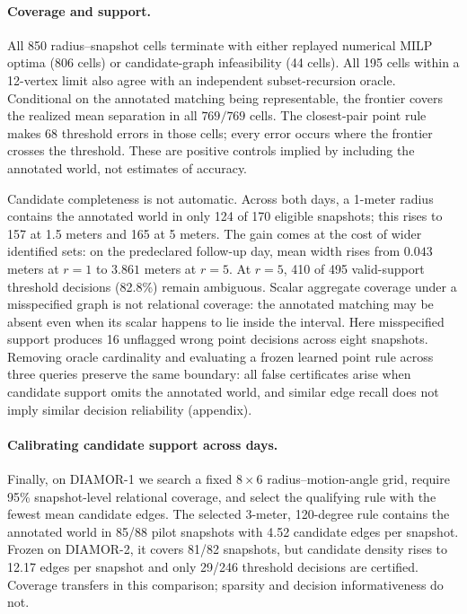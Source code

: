 \paragraph{Coverage and support.}
All 850 radius--snapshot cells terminate with either replayed numerical MILP
optima (806 cells) or candidate-graph infeasibility (44 cells).  All 195 cells
within a 12-vertex limit also agree with an independent subset-recursion oracle.
Conditional on the annotated matching being representable, the frontier covers
the realized mean separation in all $769/769$ cells.  The closest-pair point
rule makes 68 threshold errors in those cells; every error occurs where the
frontier crosses the threshold. These are positive controls implied by
including the annotated world, not estimates of accuracy.

Candidate completeness is not automatic.  Across both days, a 1-meter radius
contains the annotated world in only 124 of 170 eligible snapshots; this rises
to 157 at 1.5 meters and 165 at 5 meters.  The gain comes at the cost of wider
identified sets: on the predeclared follow-up day, mean width rises from
$0.043$ meters at $r=1$ to $3.861$ meters at $r=5$.  At $r=5$, 410 of 495
valid-support threshold decisions (82.8\%) remain ambiguous.  Scalar aggregate
coverage under a misspecified graph is not relational coverage: the annotated
matching may be absent even when its scalar happens to lie inside the interval.
Here misspecified support produces 16 unflagged wrong point decisions across
eight snapshots. Removing oracle cardinality and evaluating a frozen learned
point rule across three queries preserve the same boundary: all false
certificates arise when candidate support omits the annotated world, and
similar edge recall does not imply similar decision reliability (appendix).

\paragraph{Calibrating candidate support across days.}
Finally, on DIAMOR-1 we search a fixed $8\times6$ radius--motion-angle grid,
require 95\% snapshot-level relational coverage, and select the qualifying
rule with the fewest mean candidate edges. The selected 3-meter, 120-degree
rule contains the annotated world in 85/88 pilot snapshots with 4.52 candidate
edges per snapshot. Frozen on DIAMOR-2, it covers 81/82 snapshots, but candidate
density rises to 12.17 edges per snapshot and only 29/246 threshold decisions
are certified. Coverage transfers in this comparison; sparsity and decision
informativeness do not.

